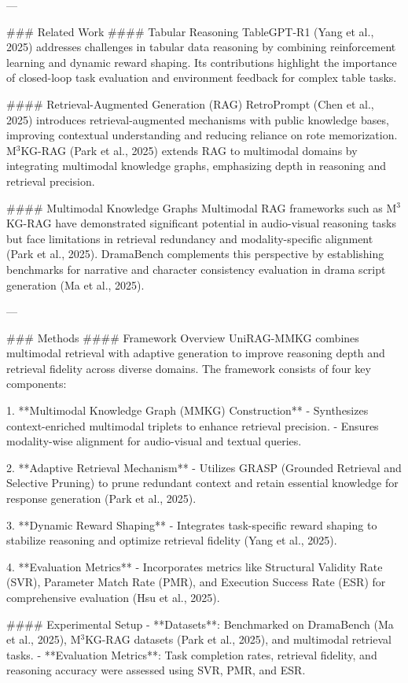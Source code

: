 ---

### Related Work  
#### Tabular Reasoning  
TableGPT-R1 (Yang et al., 2025) addresses challenges in tabular data reasoning by combining reinforcement learning and dynamic reward shaping. Its contributions highlight the importance of closed-loop task evaluation and environment feedback for complex table tasks.

#### Retrieval-Augmented Generation (RAG)  
RetroPrompt (Chen et al., 2025) introduces retrieval-augmented mechanisms with public knowledge bases, improving contextual understanding and reducing reliance on rote memorization. M$^3$KG-RAG (Park et al., 2025) extends RAG to multimodal domains by integrating multimodal knowledge graphs, emphasizing depth in reasoning and retrieval precision.

#### Multimodal Knowledge Graphs  
Multimodal RAG frameworks such as M$^3$KG-RAG have demonstrated significant potential in audio-visual reasoning tasks but face limitations in retrieval redundancy and modality-specific alignment (Park et al., 2025). DramaBench complements this perspective by establishing benchmarks for narrative and character consistency evaluation in drama script generation (Ma et al., 2025).

---

### Methods  
#### Framework Overview  
UniRAG-MMKG combines multimodal retrieval with adaptive generation to improve reasoning depth and retrieval fidelity across diverse domains. The framework consists of four key components:  

1. **Multimodal Knowledge Graph (MMKG) Construction**  
   - Synthesizes context-enriched multimodal triplets to enhance retrieval precision.  
   - Ensures modality-wise alignment for audio-visual and textual queries.

2. **Adaptive Retrieval Mechanism**  
   - Utilizes GRASP (Grounded Retrieval and Selective Pruning) to prune redundant context and retain essential knowledge for response generation (Park et al., 2025).

3. **Dynamic Reward Shaping**  
   - Integrates task-specific reward shaping to stabilize reasoning and optimize retrieval fidelity (Yang et al., 2025).

4. **Evaluation Metrics**  
   - Incorporates metrics like Structural Validity Rate (SVR), Parameter Match Rate (PMR), and Execution Success Rate (ESR) for comprehensive evaluation (Hsu et al., 2025).

#### Experimental Setup  
- **Datasets**: Benchmarked on DramaBench (Ma et al., 2025), M$^3$KG-RAG datasets (Park et al., 2025), and multimodal retrieval tasks.  
- **Evaluation Metrics**: Task completion rates, retrieval fidelity, and reasoning accuracy were assessed using SVR, PMR, and ESR.

